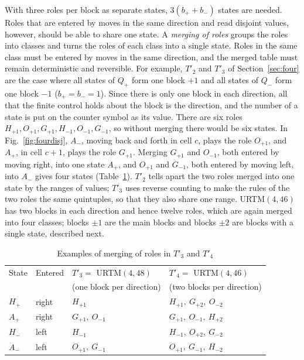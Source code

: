 \documentclass{article}
\theoremstyle{definition}
\theoremstyle{remark}
\begin{document}
With three roles per block as separate states, $3(b_++b_-)$ states are needed. Roles that are entered by moves in the same direction and read disjoint values, however, should be able to share one state.
A \emph{merging of roles} groups the roles into classes and turns the roles of each class into a single state.
Roles in the same class must be entered by moves in the same direction, and the merged table must remain deterministic and reversible.
For example, $T'_2$ and $T'_3$ of Section~\ref{sec:four} are the case where all states of $Q_+$ form one block $+1$ and all states of $Q_-$ form one block $-1$ ($b_+=b_-=1$). Since there is only one block in each direction, all that the finite control holds about the block is the direction, and the number of a state is put on the counter symbol as its value.
There are six roles $H_{+1},O_{+1},G_{+1},H_{-1},O_{-1},G_{-1}$, so without merging there would be six states.
In Fig.~\ref{fig:fourdisj}, $A_-$, moving back and forth in cell $c$, plays the role $O_{+1}$, and $A_+$, in cell $c+1$, plays the role $G_{+1}$.
Merging $G_{+1}$ and $O_{-1}$, both entered by moving right, into one state $A_+$, and $O_{+1}$ and $G_{-1}$, both entered by moving left, into $A_-$ gives four states (Table~\ref{tab:roles}).
$T'_2$ tells apart the two roles merged into one state by the ranges of values; $T'_3$ uses reverse counting to make the rules of the two roles the same quintuples, so that they also share one range.
URTM$(4,46)$ has two blocks in each direction and hence twelve roles, which are again merged into four classes; blocks $\pm1$ are the main blocks and blocks $\pm2$ are blocks with a single state, described next.
\begin{table}[tb]
\centering
\caption{Examples of merging of roles in $T'_3$ and $T'_4$}
\label{tab:roles}
\small
\begin{tabular}{llll}
\toprule
State & Entered & $T'_3=$ URTM$(4,48)$ & $T'_4=$ URTM$(4,46)$ \\
 & & (one block per direction) & (two blocks per direction) \\
\midrule
$H_+$ & right & $H_{+1}$ & $H_{+1},\ G_{+2},\ O_{-2}$ \\
$A_+$ & right & $G_{+1},\ O_{-1}$ & $G_{+1},\ O_{-1},\ H_{+2}$ \\
$H_-$ & left & $H_{-1}$ & $H_{-1},\ O_{+2},\ G_{-2}$ \\
$A_-$ & left & $O_{+1},\ G_{-1}$ & $O_{+1},\ G_{-1},\ H_{-2}$ \\
\bottomrule
\end{tabular}
\end{table}
\end{document}
